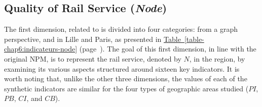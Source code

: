 \begin{refsegment}
\subsection{Quality of Rail Service (\textsl{Node})
    \label{chap6:methodologie-indicateurs-node}
    }

The first dimension, related to  is divided into four categories:    from a graph perspective, and  in Lille and Paris, as presented in \hyperref[table-chap6:indicateurs-node]{Table~\ref{table-chap6:indicateurs-node}} (page~\pageref{table-chap6:indicateurs-node}). The goal of this first dimension, in line with the original \acrshort{NPM}, is to represent the rail service, denoted by \(N\), in the region, by examining its various aspects structured around sixteen key indicators. It is worth noting that, unlike the other three dimensions, the values of each of the synthetic indicators are similar for the four types of geographic areas studied (\(PI\), \(PB\), \(CI\), and \(CB\)).%


\end{refsegment}
